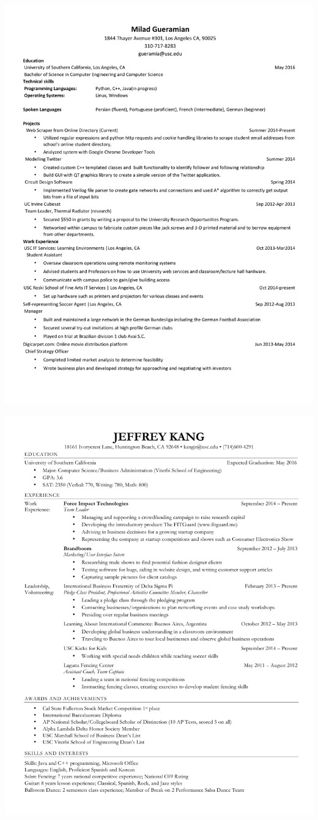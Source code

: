 \documentclass[]{article}
\begin{document}
\pagebreak

\includegraphics{milad.pdf}
\pagebreak

\pagebreak

\includegraphics{jeff.pdf}
\pagebreak
\end{document}
